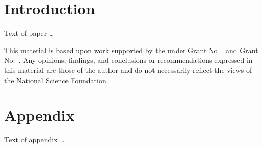 \documentclass[10pt,sigplan,review,anonymous]{acmart}\settopmatter{printfolios=true,printccs=false,printacmref=false}
\begin{document}




\maketitle


\section{Introduction}

Text of paper \ldots


\begin{acks}                            %
  This material is based upon work supported by the
   under Grant
  No.~ and Grant
  No.~.  Any opinions, findings, and
  conclusions or recommendations expressed in this material are those
  of the author and do not necessarily reflect the views of the
  National Science Foundation.
\end{acks}


%


\appendix
\section{Appendix}

Text of appendix \ldots
\end{document}
